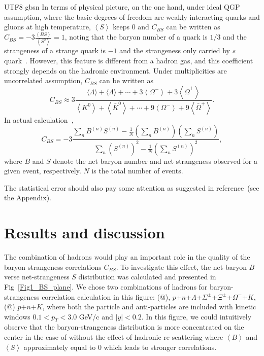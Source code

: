 \documentclass[twocolumn,showpacs,preprintnumbers,superscriptaddress,amsmath,amssymb]{revtex4}
\makeatletter
\newcommand{\Rmnum}[1]{\expandafter\@slowromancap\romannumeral #1@}
\makeatother
\begin{document}
\begin{CJK*} {UTF8} {gbsn}
	In terms of physical picture, on the one hand, under ideal QGP assumption, where the basic degrees of freedom are weakly interacting quarks and gluons at high temperature,  $\left\langle S \right\rangle$ keeps $0$ and $C_{BS}$ can be written as $C_{BS} = -3 \frac{\left\langle BS \right\rangle}{\left\langle S^{2}\right\rangle}=1$,
	noting that the baryon number of a quark is $1/3$ and the strangeness of a strange quark is $-1$ and the strangeness only carried by $s$ quark~\cite{Koch_origin}.
	However, this feature is different from a hadron gas, and this coefficient strongly depends on the hadronic environment.
	Under multiplicities are uncorrelated assumption, $C_{BS}$ can be written as~\cite{Koch_origin}
\begin{equation}
C_{B S} \approx 3 \frac{\langle\Lambda\rangle+\langle\bar{\Lambda}\rangle+\cdots+3\left\langle\Omega^{-}\right\rangle+3\left\langle\bar{\Omega}^{+}\right\rangle}{\left\langle K^{0}\right\rangle+\left\langle\bar{K}^{0}\right\rangle+\cdots+9\left\langle\Omega^{-}\right\rangle+9\left\langle\bar{\Omega}^{+}\right\rangle}.
\end{equation}
	In actual calculation~\cite{Koch_origin},
\begin{equation}
C_{B S}=-3 \frac{\sum_{n} B^{(n)} S^{(n)}-\frac{1}{N}\left(\sum_{n} B^{(n)}\right)\left(\sum_{n} S^{(n)}\right)}{\sum_{n}\left(S^{(n)}\right)^{2}-\frac{1}{N}\left(\sum_{n} S^{(n)}\right)^{2}},
\end{equation}
where $B$ and $S$ denote the net baryon number and net strangeness observed for a given event, respectively.
$N$ is the total number of events.

The statistical error should also pay some attention as suggested in reference~\cite{Luo_UrQMD,Luo_2012}(see the Appendix).	
%
	\section{Results and discussion}
	\label{sec:result}
		
		The combination of hadrons would play an important role in the quality of the baryon-strangeness correlations $C_{BS}$. To investigate this effect, the net-baryon $B$ verse net-strangeness $S$ distribution was calculated and presented in Fig~\ref{Fig1_BS_plane}.
		We chose two combinations of hadrons for baryon-strangeness correlation calculation in this figure:
		(\Rmnum{1}), $p$+$n$+$\Lambda$+$\Sigma^{\pm}$+$\Xi^{\pm}$+$\Omega^{-}$+$K$, (\Rmnum{2}) $p$+$n$+$K$, 
	where both the particle and anti-particles are included
	with kinetic windows $0.1<p_{T}<3.0$ GeV/c and $|y|<0.2$.
	In this figure, we could intuitively observe that the baryon-strangeness distribution is more concentrated on the center in the case of without the effect of hadronic re-scattering where $\left\langle B \right\rangle$ and $\left\langle S \right\rangle$ approximately equal to 0 which leads to stronger correlations.
	

\end{CJK*}
\end{document}
